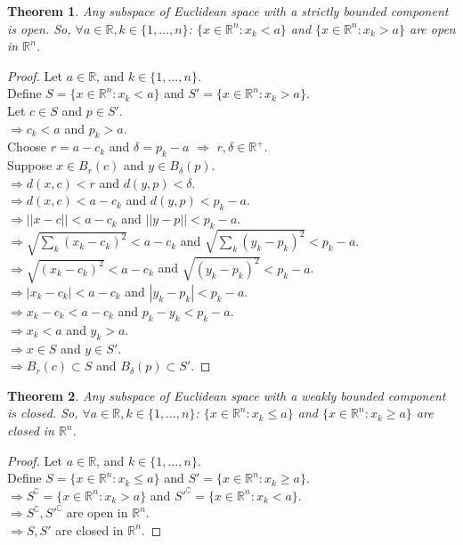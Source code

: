 \documentclass{article}
\newtheorem{theorem}{Theorem}[section]
\begin{document}
			\begin{theorem}
				Any subspace of Euclidean space with a strictly bounded component is open. So, $\forall a \in \mathbb{R}, k \in \{ 1, \ldots, n \}$: 
				$\{ x \in \mathbb{R}^n: x_k < a \}$ and $\{ x \in \mathbb{R}^n: x_k > a \}$ are open in $\mathbb{R}^n$.
			\end{theorem}
			\begin{proof} 
				Let $a \in \mathbb{R}$, and $k \in \{ 1, \ldots, n \}$. \\
				Define $S = \{ x \in \mathbb{R}^n: x_k < a \}$ and $S' = \{ x \in \mathbb{R}^n: x_k > a \}$. \\
				Let $c \in S$ and $p \in S'$. \\
				$\Rightarrow c_k < a$ and $p_k > a$. \\
				Choose $r = a - c_k$ and $\delta = p_k - a$ $\Rightarrow$ $r, \delta \in \mathbb{R}^+$. \\
				Suppose $x \in B_{r}(c)$ and $y \in B_{\delta}(p)$. \\
				$\Rightarrow d(x, c) < r$ and $d(y, p) < \delta$. \\
				$\Rightarrow d(x, c) < a - c_k$ and $d(y, p) < p_k - a$. \\
				$\Rightarrow || x - c || < a - c_k$ and $|| y - p || < p_k - a$. \\
				$\Rightarrow \sqrt{\sum_{k} (x_k - c_k)^2} <  a - c_k$ and $\sqrt{\sum_{k} (y_k - p_k)^2} < p_k - a$. \\
				$\Rightarrow \sqrt{(x_k - c_k)^2} <  a - c_k$ and $\sqrt{(y_k - p_k)^2} < p_k - a$. \\
				$\Rightarrow | x_k - c_k | <  a - c_k$ and $| y_k - p_k | <  p_k - a$. \\
				$\Rightarrow x_k - c_k <  a - c_k$ and $p_k - y_k < p_k - a$. \\
				$\Rightarrow x_k <  a$ and $y_k >  a$. \\
				$\Rightarrow x \in S$ and $y \in S'$. \\
				$\Rightarrow B_{r}(c) \subset S$ and $B_{\delta}(p) \subset S'$.
			\end{proof}

			\begin{theorem}
				Any subspace of Euclidean space with a weakly bounded component is closed. So, $\forall a \in \mathbb{R}, k \in \{ 1, \ldots, n \}$: 
				$\{ x \in \mathbb{R}^n: x_k \leq a \}$ and $\{ x \in \mathbb{R}^n: x_k \geq a \}$ are closed in $\mathbb{R}^n$.
			\end{theorem}
			\begin{proof} 
				Let $a \in \mathbb{R}$, and $k \in \{ 1, \ldots, n \}$. \\
				Define $S = \{ x \in \mathbb{R}^n: x_k \leq a \}$ and $S' = \{ x \in \mathbb{R}^n: x_k \geq a \}$. \\
				$\Rightarrow S^\complement = \{ x \in \mathbb{R}^n: x_k > a \}$ and $S'^\complement = \{ x \in \mathbb{R}^n: x_k < a \}$. \\
				$\Rightarrow S^\complement, S'^\complement$ are open in $\mathbb{R}^n$. \\
				$\Rightarrow S, S'$ are closed in  $\mathbb{R}^n$.
			\end{proof}
\end{document}
